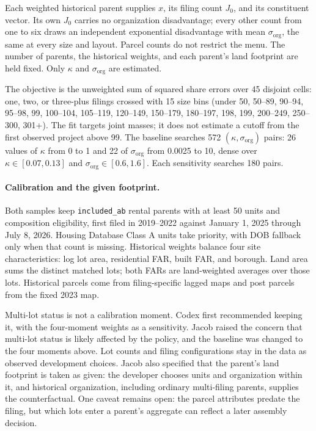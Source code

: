 Each weighted historical parent supplies $x$, its filing count $J_0$, and its
constituent vector. Its own $J_0$ carries no organization disadvantage; every
other count from one to six draws an independent exponential disadvantage with
mean $\sigma_{\mathrm{org}}$, the same at every size and layout. Parcel counts
do not restrict the menu. The number of parents, the historical weights, and
each parent's land footprint are held fixed. Only $\kappa$ and
$\sigma_{\mathrm{org}}$ are estimated.

The objective is the unweighted sum of squared share errors over 45 disjoint
cells: one, two, or three-plus filings crossed with 15 size bins (under 50,
50--89, 90--94, 95--98, 99, 100--104, 105--119, 120--149, 150--179, 180--197,
198, 199, 200--249, 250--300, 301+). The fit targets joint masses; it does
not estimate a cutoff from the first observed project above 99. The baseline
searches 572 $(\kappa,\sigma_{\mathrm{org}})$ pairs: 26 values of $\kappa$
from 0 to 1 and 22 of $\sigma_{\mathrm{org}}$ from 0.0025 to 10, dense over
$\kappa\in[0.07,0.13]$ and $\sigma_{\mathrm{org}}\in[0.6,1.6]$. Each
sensitivity searches 180 pairs.

\paragraph{Calibration and the given footprint.} Both samples keep
\texttt{included\_ab} rental parents with at least 50 units and composition
eligibility, first filed in 2019--2022 against January 1, 2025 through July 8,
2026. Housing Database Class A units take priority, with DOB fallback only
when that count is missing. Historical weights balance four site
characteristics: log lot area, residential FAR, built FAR, and borough. Land
area sums the distinct matched lots; both FARs are land-weighted averages over
those lots. Historical parcels come from filing-specific lagged maps and post
parcels from the fixed 2023 map.

Multi-lot status is not a calibration moment. Codex first recommended keeping
it, with the four-moment weights as a sensitivity. Jacob raised the concern
that multi-lot status is likely affected by the policy, and the baseline was
changed to the four moments above. Lot counts and filing configurations stay
in the data as observed development choices. Jacob also specified that the
parent's land footprint is taken as given: the developer chooses units and
organization within it, and historical organization, including ordinary
multi-filing parents, supplies the counterfactual. One caveat remains open:
the parcel attributes predate the filing, but which lots enter a parent's
aggregate can reflect a later assembly decision.


